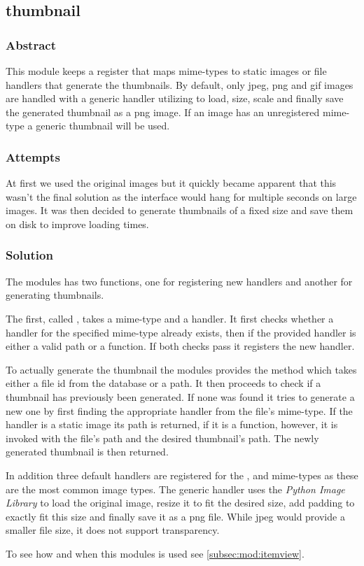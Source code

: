 \subsection{thumbnail}
\def\kapitelautor{Clemens Stadlbauer}

\subsubsection{Abstract}

This module keeps a register that maps mime-types to static images or file
handlers that generate the thumbnails. By default, only jpeg, png and gif
images are handled with a generic handler utilizing  to
load, size, scale and finally save the generated thumbnail as a png image. If
an image has an unregistered mime-type a generic thumbnail will be used.

\subsubsection{Attempts}

At first we used the original images but it quickly became apparent that this
wasn't the final solution as the interface would hang for multiple seconds on
large images. It was then decided to generate thumbnails of a fixed size and
save them on disk to improve loading times.

\subsubsection{Solution} %

The modules has two functions, one for registering new handlers and another for
generating thumbnails.

The first, called , takes a mime-type and a handler. It first
checks whether a handler for the specified mime-type already exists, then if
the provided handler is either a valid path or a function. If both checks pass
it registers the new handler.

To actually generate the thumbnail the modules provides the
 method which takes either a file id from the database or
a path. It then proceeds to check if a thumbnail has previously been generated.
If none was found it tries to generate a new one by first finding the
appropriate handler from the file's mime-type. If the handler is a static image
its path is returned, if it is a function, however, it is invoked with the
file's path and the desired thumbnail's path. The newly generated thumbnail is
then returned.

In addition three default handlers are registered for the ,
 and  mime-types as these are the most
common image types. The generic handler uses the \emph{Python Image
Library} to load the original image, resize it to fit the desired
size, add padding to exactly fit this size and finally save it as a png file.
While jpeg would provide a smaller file size, it does not support transparency.

To see how and when this modules is used see \cref{subsec:mod:itemview}.
